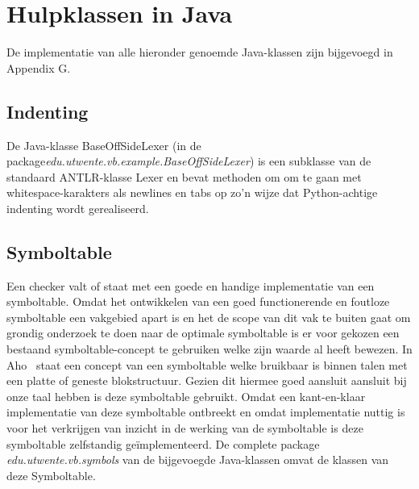 \chapter{Hulpklassen in Java}
De implementatie van alle hieronder genoemde Java-klassen zijn bijgevoegd in Appendix G.

\section{Indenting}
De Java-klasse BaseOffSideLexer (in de package\emph{edu.utwente.vb.example.BaseOffSideLexer}) is een subklasse van de standaard ANTLR-klasse Lexer en bevat methoden om om te gaan met whitespace-karakters als newlines en tabs op zo'n wijze dat Python-achtige indenting wordt gerealiseerd.

\section{Symboltable}
Een checker valt of staat met een goede en handige implementatie van een symboltable. Omdat het ontwikkelen van een goed functionerende en foutloze symboltable een vakgebied apart is en het de scope van dit vak te buiten gaat om grondig onderzoek te doen naar de optimale symboltable is er voor gekozen een bestaand symboltable-concept te gebruiken welke zijn waarde al heeft bewezen. In Aho~\cite[p.85-90]{aho2007compilers} staat een concept van een symboltable welke bruikbaar is binnen talen met een platte of geneste blokstructuur. Gezien dit hiermee goed aansluit aansluit bij onze taal hebben is deze symboltable gebruikt. Omdat een kant-en-klaar implementatie van deze symboltable ontbreekt en omdat implementatie nuttig is voor het verkrijgen van inzicht in de werking van de symboltable is deze symboltable zelfstandig ge\"{i}mplementeerd. De complete package \emph{edu.utwente.vb.symbols} van de bijgevoegde Java-klassen omvat de klassen van deze Symboltable.

